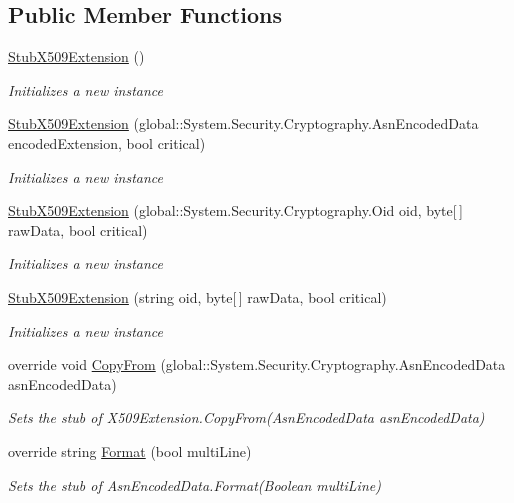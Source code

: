 \subsection*{Public Member Functions}
\begin{DoxyCompactItemize}
\item 
\hyperlink{class_system_1_1_security_1_1_cryptography_1_1_x509_certificates_1_1_fakes_1_1_stub_x509_extension_a7c443361705e5b1ee148fc8d9ec0e1c8}{Stub\-X509\-Extension} ()
\begin{DoxyCompactList}\small\item\em Initializes a new instance\end{DoxyCompactList}\item 
\hyperlink{class_system_1_1_security_1_1_cryptography_1_1_x509_certificates_1_1_fakes_1_1_stub_x509_extension_a238e66cb0e04d0b35d770a4f8e8e46dd}{Stub\-X509\-Extension} (global\-::\-System.\-Security.\-Cryptography.\-Asn\-Encoded\-Data encoded\-Extension, bool critical)
\begin{DoxyCompactList}\small\item\em Initializes a new instance\end{DoxyCompactList}\item 
\hyperlink{class_system_1_1_security_1_1_cryptography_1_1_x509_certificates_1_1_fakes_1_1_stub_x509_extension_a2eb364c4f2e2c5bd76aed74eae8928e2}{Stub\-X509\-Extension} (global\-::\-System.\-Security.\-Cryptography.\-Oid oid, byte\mbox{[}$\,$\mbox{]} raw\-Data, bool critical)
\begin{DoxyCompactList}\small\item\em Initializes a new instance\end{DoxyCompactList}\item 
\hyperlink{class_system_1_1_security_1_1_cryptography_1_1_x509_certificates_1_1_fakes_1_1_stub_x509_extension_aad3943b13e0aaab879205cf76531cc91}{Stub\-X509\-Extension} (string oid, byte\mbox{[}$\,$\mbox{]} raw\-Data, bool critical)
\begin{DoxyCompactList}\small\item\em Initializes a new instance\end{DoxyCompactList}\item 
override void \hyperlink{class_system_1_1_security_1_1_cryptography_1_1_x509_certificates_1_1_fakes_1_1_stub_x509_extension_ae6e5d8df3dcaf6ab084db476c0cc6175}{Copy\-From} (global\-::\-System.\-Security.\-Cryptography.\-Asn\-Encoded\-Data asn\-Encoded\-Data)
\begin{DoxyCompactList}\small\item\em Sets the stub of X509\-Extension.\-Copy\-From(\-Asn\-Encoded\-Data asn\-Encoded\-Data)\end{DoxyCompactList}\item 
override string \hyperlink{class_system_1_1_security_1_1_cryptography_1_1_x509_certificates_1_1_fakes_1_1_stub_x509_extension_a7739b7fe83c161e0eaa52fcef3b50198}{Format} (bool multi\-Line)
\begin{DoxyCompactList}\small\item\em Sets the stub of Asn\-Encoded\-Data.\-Format(\-Boolean multi\-Line)\end{DoxyCompactList}\end{DoxyCompactItemize}
